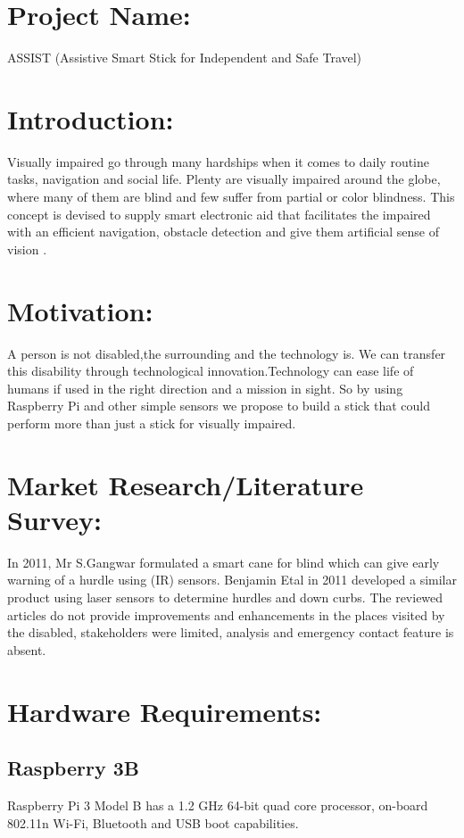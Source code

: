 \section{Project Name:} ASSIST (Assistive Smart Stick for Independent and Safe Travel)
 
\section{Introduction: }
Visually impaired go through many hardships when it comes to daily routine tasks, navigation and social life. Plenty are visually impaired around the globe, where many of them are blind and few suffer from partial or color blindness. This concept is devised to supply smart electronic aid that facilitates the impaired with an efficient navigation, obstacle detection and give them artificial sense of vision .

\section{Motivation:}

A person is not disabled,the surrounding and the technology is. We can transfer this disability through technological innovation.Technology can ease life of humans if used in the right direction and a mission in sight. So by using Raspberry Pi and other simple sensors we propose to build a stick that could perform more than just a stick for visually impaired.

\section{Market Research/Literature Survey:}
In 2011, Mr S.Gangwar formulated a smart cane for blind which can give early warning of a hurdle using (IR) sensors. Benjamin Etal in 2011 developed a similar product using laser sensors to determine hurdles and down curbs. The reviewed articles do not provide improvements and enhancements in the places visited by the disabled, stakeholders were limited, analysis and emergency contact feature is absent.

\section{Hardware Requirements:}
\subsection{Raspberry 3B}
Raspberry Pi 3 Model B has a 1.2 GHz 64-bit quad core processor, on-board 802.11n Wi-Fi, Bluetooth and USB boot capabilities.

